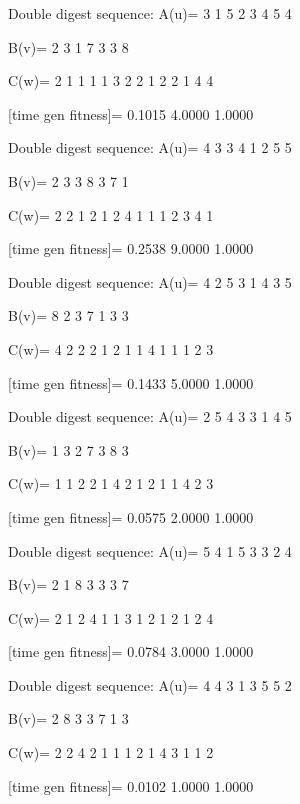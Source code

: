 Double digest sequence:
A(u)=
     3     1     5     2     3     4     5     4

B(v)=
     2     3     1     7     3     3     8

C(w)=
     2     1     1     1     1     3     2     2     1     2     2     1     4     4

[time gen fitness]=
    0.1015    4.0000    1.0000

Double digest sequence:
A(u)=
     4     3     3     4     1     2     5     5

B(v)=
     2     3     3     8     3     7     1

C(w)=
     2     2     1     2     1     2     4     1     1     1     2     3     4     1

[time gen fitness]=
    0.2538    9.0000    1.0000

Double digest sequence:
A(u)=
     4     2     5     3     1     4     3     5

B(v)=
     8     2     3     7     1     3     3

C(w)=
     4     2     2     2     1     2     1     1     4     1     1     1     2     3

[time gen fitness]=
    0.1433    5.0000    1.0000

Double digest sequence:
A(u)=
     2     5     4     3     3     1     4     5

B(v)=
     1     3     2     7     3     8     3

C(w)=
     1     1     2     2     1     4     2     1     2     1     1     4     2     3

[time gen fitness]=
    0.0575    2.0000    1.0000

Double digest sequence:
A(u)=
     5     4     1     5     3     3     2     4

B(v)=
     2     1     8     3     3     3     7

C(w)=
     2     1     2     4     1     1     3     1     2     1     2     1     2     4

[time gen fitness]=
    0.0784    3.0000    1.0000

Double digest sequence:
A(u)=
     4     4     3     1     3     5     5     2

B(v)=
     2     8     3     3     7     1     3

C(w)=
     2     2     4     2     1     1     1     2     1     4     3     1     1     2

[time gen fitness]=
    0.0102    1.0000    1.0000

